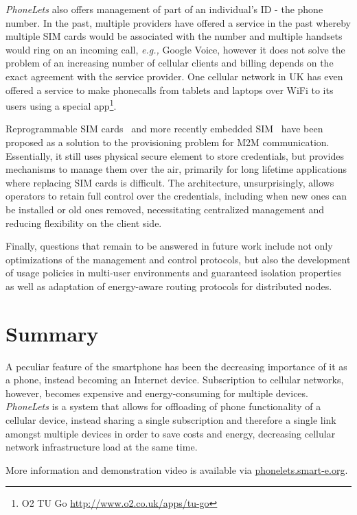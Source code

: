 \documentclass{sig-alternate-10pt}
\providecommand{\eg}{\emph{e.g.,} }
\begin{document}
\emph{PhoneLets} also offers management of part of an individual's ID - the phone number. In the past, multiple providers have offered a service in the past whereby multiple SIM cards would be associated with the number and multiple handsets would ring on an incoming call, \eg Google Voice, however it does not solve the problem of an increasing number of cellular clients and billing depends on the exact agreement with the service provider. One cellular network in UK has even offered a service to make phonecalls from tablets and laptops over WiFi to its users using a special app\footnote{O2 TU Go \url{http://www.o2.co.uk/apps/tu-go}}.

Reprogrammable SIM cards~\cite{OFcom:2012tx} and more recently embedded SIM~\cite{Association:2013ub} have been proposed as a solution to the provisioning problem for M2M communication. Essentially, it still uses physical secure element to store credentials, but provides mechanisms to manage them over the air, primarily for long lifetime applications where replacing SIM cards is difficult. The architecture, unsurprisingly, allows operators to retain full control over the credentials, including when new ones can be installed or old ones removed, necessitating centralized management and reducing flexibility on the client side.

Finally, questions that remain to be answered in future work include not only optimizations of the management and control protocols, but also the development of usage policies in multi-user environments and guaranteed isolation properties as well as adaptation of energy-aware routing protocols for distributed nodes.

\section{Summary}

A peculiar feature of the smartphone has been the decreasing importance of it as a phone, instead becoming an Internet device. Subscription to cellular networks, however, becomes expensive and energy-consuming for multiple devices. \emph{PhoneLets} is a system that allows for offloading of phone functionality of a cellular device, instead sharing a single subscription and therefore a single link amongst multiple devices in order to save costs and energy, decreasing cellular network infrastructure load at the same time.

More information and demonstration video is available via \url{phonelets.smart-e.org}.
\end{document}
